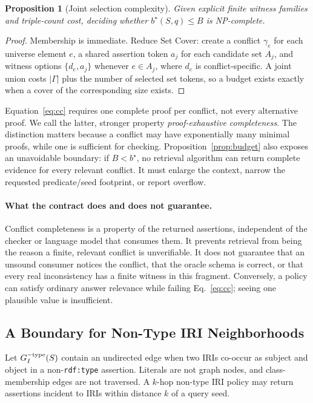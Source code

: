 \documentclass[letterpaper]{article} %
\newtheorem{proposition}{Proposition}
\begin{document}
\begin{proposition}[Joint selection complexity]
Given explicit finite witness families and triple-count cost, deciding whether
$b^\star(S,q)\le B$ is NP-complete.
\end{proposition}
\begin{proof}
Membership is immediate.  Reduce Set Cover: create a conflict $\gamma_e$ for
each universe element $e$, a shared assertion token $a_j$ for each candidate
set $A_j$, and witness options $\{d_e,a_j\}$ whenever $e\in A_j$, where $d_e$
is conflict-specific.  A joint union costs $|\Gamma|$ plus the number of
selected set tokens, so a budget exists exactly when a cover of the
corresponding size exists.
\end{proof}

Equation~\ref{eq:cc} requires one complete proof per conflict, not every
alternative proof.  We call the latter, stronger property
\emph{proof-exhaustive completeness}.  The distinction matters because a
conflict may have exponentially many minimal proofs, while one is sufficient
for checking.  Proposition~\ref{prop:budget} also exposes an unavoidable boundary: if
$B<b^\star$, no retrieval algorithm can return complete evidence for every
relevant conflict.  It must enlarge the context, narrow the requested
predicate/seed footprint, or report overflow.

\paragraph{What the contract does and does not guarantee.}
Conflict completeness is a property of the returned assertions, independent
of the checker or language model that consumes them.  It prevents retrieval
from being the reason a finite, relevant conflict is unverifiable.  It does
not guarantee that an unsound consumer notices the conflict, that the oracle
schema is correct, or that every real inconsistency has a finite witness in
this fragment.  Conversely, a policy can satisfy ordinary answer relevance
while failing Eq.~\ref{eq:cc}; seeing one plausible value is insufficient.

\subsection{A Boundary for Non-Type IRI Neighborhoods}

Let $G_I^{-{\rm type}}(S)$ contain an undirected edge when two IRIs co-occur as
subject and object in a non-\texttt{rdf:type} assertion.  Literals are not
graph nodes, and class-membership edges are not traversed.  A $k$-hop
non-type IRI policy may return assertions incident to IRIs within distance
$k$ of a query seed.
\end{document}
